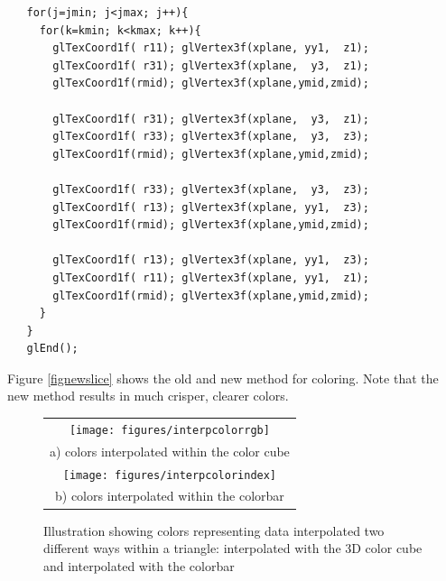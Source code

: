 \documentclass[11pt,twoside]{book}
\newcommand{\figoptions}{P}
\begin{document}
\begin{verbatim}
   for(j=jmin; j<jmax; j++){
     for(k=kmin; k<kmax; k++){
       glTexCoord1f( r11); glVertex3f(xplane, yy1,  z1);
       glTexCoord1f( r31); glVertex3f(xplane,  y3,  z1);
       glTexCoord1f(rmid); glVertex3f(xplane,ymid,zmid);

       glTexCoord1f( r31); glVertex3f(xplane,  y3,  z1);
       glTexCoord1f( r33); glVertex3f(xplane,  y3,  z3);
       glTexCoord1f(rmid); glVertex3f(xplane,ymid,zmid);

       glTexCoord1f( r33); glVertex3f(xplane,  y3,  z3);
       glTexCoord1f( r13); glVertex3f(xplane, yy1,  z3);
       glTexCoord1f(rmid); glVertex3f(xplane,ymid,zmid);

       glTexCoord1f( r13); glVertex3f(xplane, yy1,  z3);
       glTexCoord1f( r11); glVertex3f(xplane, yy1,  z1);
       glTexCoord1f(rmid); glVertex3f(xplane,ymid,zmid);
     }
   }
   glEnd();
\end{verbatim}



Figure \ref{fignewslice} shows the old and new method for coloring.  Note that the new method results in much crisper, clearer colors.



\begin{figure}[\figoptions]
\begin{center}
\begin{tabular}{c}
\texttt{[image: figures/interpcolorrgb]}\\
a) colors interpolated within the color cube\\
\texttt{[image: figures/interpcolorindex]}\\
b) colors interpolated within the colorbar\\
\end{tabular}
\end{center}
\caption[Color interpolation examples]
{Illustration showing colors representing data interpolated two different ways within a triangle: interpolated with the 3D color cube and interpolated with the colorbar}
\label{colorinterp}%
\end{figure}
\end{document}
